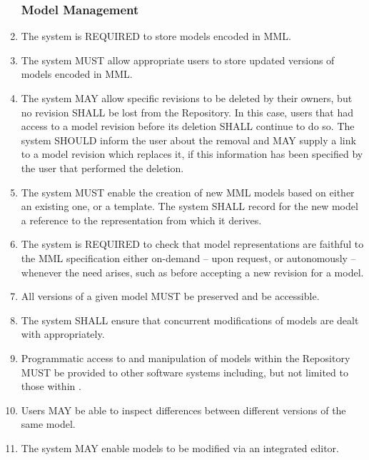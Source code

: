 \begin{enumerate}[1]
\subsubsection{Model Management}
\item The system is REQUIRED to store models encoded in \gls{MML}. 

\item The system MUST allow appropriate users to store updated versions of models encoded in MML.

\item The system MAY allow specific \glspl{revision} to be deleted by their owners, but no revision SHALL be lost from the Repository. In this case, users that had access to a model revision before its deletion SHALL continue to do so. The system SHOULD inform the user about the removal and MAY supply a link to a model revision which replaces it, if this information has been specified by the user that performed the deletion. 

\item The system MUST enable the creation of new MML models based on either an existing one, or a template. The system SHALL record for the new model a reference  to the representation from which it derives.

\item The system is REQUIRED to check that model representations are faithful to the MML specification either on-demand -- upon request, or autonomously -- whenever the need arises, such as before accepting a new revision for a model. 

\item All versions of a given model MUST be preserved and be accessible.

\item The system SHALL ensure that concurrent modifications of models are dealt with appropriately.

\item Programmatic access to and manipulation of models within the Repository MUST be provided to other software systems including, but not limited to those within \ddmore. 

\item Users MAY be able to inspect differences between different versions of the same model.

\item The system MAY enable models to be modified via an integrated editor.


\end{enumerate}
